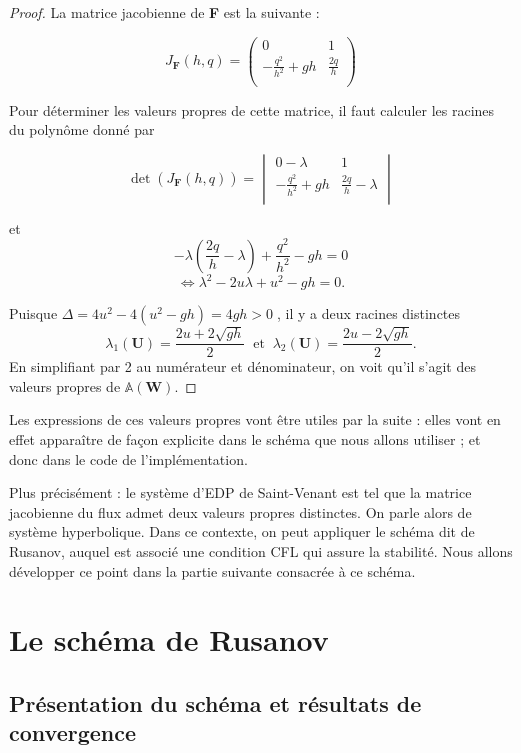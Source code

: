 \documentclass[
11pt, %
francais, %
singlespacing, %
headsepline, %
]{MastersDoctoralThesis} %
\theoremstyle{definition}
\begin{document}
\begin{proof}

La matrice jacobienne de \textbf{F} est la suivante :

$$J_{\textbf{F}}(h, q) =\begin{pmatrix}
   0 & 1  \\
   -\frac{q^{2}}{h^{2}}+gh & \frac{2q}{h}  \\
\end{pmatrix}$$

Pour déterminer les valeurs propres de cette matrice, il faut calculer les racines du polynôme donné par

$$\det (J_{\textbf{F}}(h, q)) =\begin{vmatrix}
   0-\lambda & 1  \\
   -\frac{q^{2}}{h^{2}}+gh & \frac{2q}{h}-\lambda  \\
\end{vmatrix}$$

et $$-\lambda(\frac{2q}{h}-\lambda)+\frac{q^{2}}{h^{2}}-gh=0$$
$$\Leftrightarrow \lambda^{2}-2u\lambda+u^{2}-gh=0.$$

Puisque $\Delta=4u^{2}-4(u^{2}-gh)=4gh>0\phantom{.}$, il y a deux racines distinctes 
$$\lambda_{1}(\textbf{U})=\frac{2u+2\sqrt{gh}}{2} \phantom{..}\text{et}\phantom{..} \lambda_{2}(\textbf{U})=\frac{2u-2\sqrt{gh}}{2}.$$
En simplifiant par 2 au numérateur et dénominateur, on voit qu'il s'agit des valeurs propres de  $\mathbb{A}(\textbf{W}).$

\end{proof}

Les expressions de ces valeurs propres vont être utiles par la suite : elles vont en effet apparaître de fa\c con explicite dans le schéma que nous allons utiliser ; et donc dans le code de l'implémentation.

Plus précisément : le système d'EDP de Saint-Venant est tel que la matrice jacobienne du flux admet deux valeurs propres distinctes. On parle alors de système hyperbolique.
Dans ce contexte, on peut appliquer le schéma dit de Rusanov, auquel est associé une condition CFL qui assure la stabilité. Nous allons développer ce point dans la partie suivante consacrée à ce schéma.

\section{Le schéma de Rusanov}

\subsection{Présentation du schéma et résultats de convergence}
\end{document}
